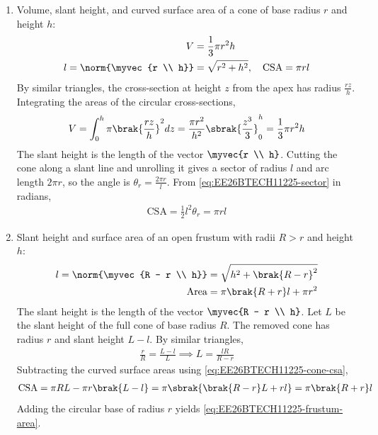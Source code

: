 \begin{enumerate}[label=\thesubsection.\arabic*, ref=\thesubsection.\theenumi]
\item Volume, slant height, and curved surface area of a cone of base radius $r$ and height $h$:
\begin{align}
	V &= \frac{1}{3}\pi r^2 h
	\label{eq:EE26BTECH11225-cone-vol}
	\\
	l = \norm{\myvec{r \\ h}} &= \sqrt{r^2 + h^2}, \quad \text{CSA} = \pi r l
	\label{eq:EE26BTECH11225-cone-csa}
\end{align}
\solution
By similar triangles, the cross-section at height $z$ from the apex has radius $\frac{rz}{h}$. Integrating the areas of the circular cross-sections,
\begin{align}
	V = \int_{0}^{h}\pi\brak{\frac{rz}{h}}^2 dz = \frac{\pi r^2}{h^2}\sbrak{\frac{z^3}{3}}_{0}^{h} = \frac{1}{3}\pi r^2 h
\end{align}
The slant height is the length of the vector $\myvec{r \\ h}$. Cutting the cone along a slant line and unrolling it gives a sector of radius $l$ and arc length $2\pi r$, so the angle is $\theta_r = \frac{2\pi r}{l}$. From \eqref{eq:EE26BTECH11225-sector} in radians,
\begin{align}
	\text{CSA} = \frac{1}{2}l^2\theta_r = \pi r l
\end{align}

\item Slant height and surface area of an open frustum with radii $R > r$ and height $h$:
\begin{align}
	l = \norm{\myvec{R - r \\ h}} &= \sqrt{h^2 + \brak{R - r}^2}
	\label{eq:EE26BTECH11225-frustum-l}
	\\
	\text{Area} &= \pi\brak{R + r}l + \pi r^2
	\label{eq:EE26BTECH11225-frustum-area}
\end{align}
\solution
The slant height is the length of the vector $\myvec{R - r \\ h}$. Let $L$ be the slant height of the full cone of base radius $R$. The removed cone has radius $r$ and slant height $L - l$. By similar triangles,
\begin{align}
	\frac{r}{R} = \frac{L - l}{L}
	\implies L = \frac{lR}{R - r}
\end{align}
Subtracting the curved surface areas using \eqref{eq:EE26BTECH11225-cone-csa},
\begin{align}
	\text{CSA} = \pi RL - \pi r\brak{L - l}
	= \pi\sbrak{\brak{R - r}L + rl}
	= \pi\brak{R + r}l
\end{align}
Adding the circular base of radius $r$ yields \eqref{eq:EE26BTECH11225-frustum-area}.


\end{enumerate}
